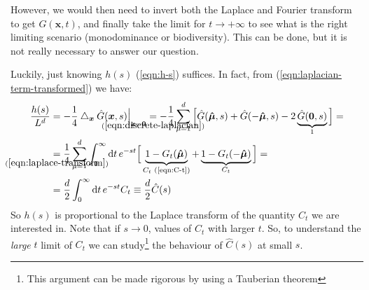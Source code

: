 \documentclass[../../main.tex]{subfiles}
\begin{document}
However, we would then need to invert both the Laplace and Fourier transform to get $G(\bm{x},t)$, and finally take the limit for $t \to +\infty$ to see what is the right limiting scenario (monodominance or biodiversity). This can be done, but it is not really necessary to answer our question.

Luckily, just knowing $h(s)$ (\ref{eqn:h-s}) suffices. In fact, from (\ref{eqn:laplacian-term-transformed}) we have:
\begin{align*}
    \frac{h(s)}{L^d} &= -\frac{1}{4} \bigtriangleup_{\bm{x}} \hat{G}(\bm{x},s)  \Big|_{\bm{x}=\bm{0}} \underset{\mathclap{(\ref{eqn:discrete-laplacian})}}{=}  -\frac{1}{4} \sum_{\mu=1}^d \Big[\hat{G}(\bm{\hat{\mu}}, s) + \hat{G}(-\bm{\hat{\mu}},s) - 2\underbrace{\hat{G}(\bm{0},s)}_{1}  \Big] =\\
    &\underset{\mathclap{(\ref{eqn:laplace-transform})}}{=}  \frac{1}{4} \sum_{\mu=1}^d \int_0^\infty \dd{t} e^{-st} \Big[\underbrace{1 - G_t(\bm{\hat{\mu}})}_{C_t\text{ (\ref{eqn:C-t})}} + \underbrace{1 - G_t(-\bm{\hat{\mu}})}_{C_t}   \Big] =\\
    &= \frac{d}{2} \int_0^\infty \dd{t} e^{-st} C_t \equiv \frac{d}{2} \hat{C}(s)  
\end{align*}
So $h(s)$ is proportional to the Laplace transform of the quantity $C_t$ we are interested in. Note that if $s \to 0$, values of $C_t$ with larger $t$. So, to understand the \textit{large} $t$ limit of $C_t$ we can study\footnote{This argument can be made rigorous by using a Tauberian theorem} the behaviour of $\hat{C}(s)$ at small $s$. 

\medskip
\end{document}
